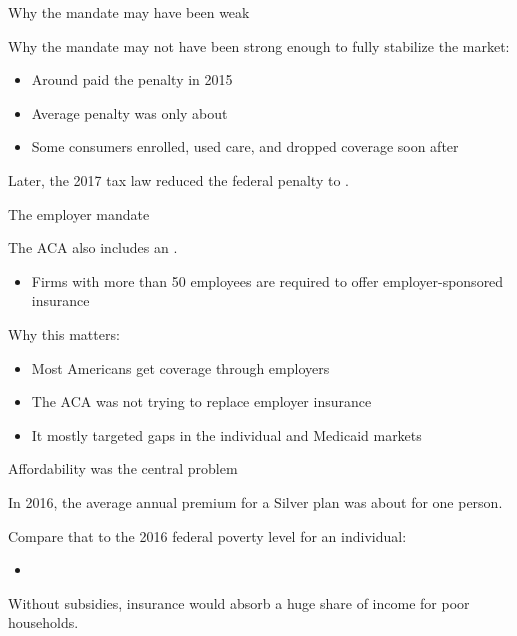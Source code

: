 \begin{frame}{Why the mandate may have been weak}

    Why the mandate may not have been strong enough to fully stabilize the market:
    \begin{itemize}
        \item Around  paid the penalty in 2015
        \item Average penalty was only about 
        \item Some consumers enrolled, used care, and dropped coverage soon after
    \end{itemize}

    \vspace{3mm}

    Later, the 2017 tax law reduced the federal penalty to .

\end{frame}
\begin{frame}{The employer mandate}

    The ACA also includes an .
    \begin{itemize}
        \item Firms with more than 50 employees are required to offer employer-sponsored insurance
    \end{itemize}

    \vspace{3mm}

    Why this matters:
    \begin{itemize}
        \item Most Americans get coverage through employers
        \item The ACA was not trying to replace employer insurance
        \item It mostly targeted gaps in the individual and Medicaid markets
    \end{itemize}

\end{frame}
\begin{frame}{Affordability was the central problem}

    In 2016, the average annual premium for a Silver plan was about  for one person.

    \vspace{3mm}

    Compare that to the 2016 federal poverty level for an individual:
    \begin{itemize}
        \item {}
    \end{itemize}

    \vspace{3mm}

    Without subsidies, insurance would absorb a huge share of income for poor households.

\end{frame}
